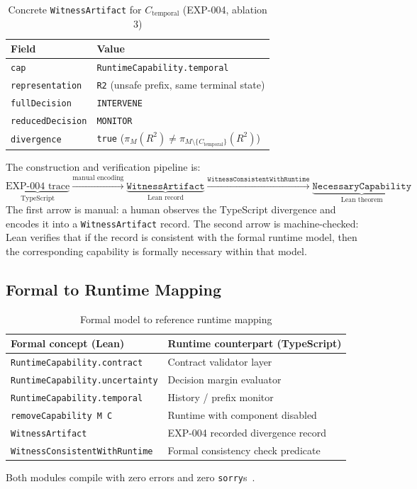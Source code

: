 \begin{table}[htbp]
\caption{Concrete \texttt{WitnessArtifact} for $C_{\text{temporal}}$ (EXP-004, ablation 3)}
\label{tab:witness-example}
\centering\small
\begin{tabular}{ll}
\toprule
\textbf{Field} & \textbf{Value} \\
\midrule
\texttt{cap}              & \texttt{RuntimeCapability.temporal} \\
\texttt{representation}   & \texttt{R2} (unsafe prefix, same terminal state) \\
\texttt{fullDecision}     & \texttt{INTERVENE} \\
\texttt{reducedDecision}  & \texttt{MONITOR} \\
\texttt{divergence}       & \texttt{true} ($\pi_M(R^2) \neq \pi_{M\setminus\{C_\text{temporal}\}}(R^2)$) \\
\bottomrule
\end{tabular}
\end{table}

The construction and verification pipeline is:
\[
\underbrace{\text{EXP-004 trace}}_{\text{TypeScript}}
\xrightarrow{\text{manual encoding}}
\underbrace{\texttt{WitnessArtifact}}_{\text{Lean record}}
\xrightarrow{\texttt{WitnessConsistentWithRuntime}}
\underbrace{\texttt{NecessaryCapability}}_{\text{Lean theorem}}
\]
The first arrow is manual: a human observes the TypeScript divergence and encodes
it into a \texttt{WitnessArtifact} record. The second arrow is machine-checked:
Lean verifies that if the record is consistent with the formal runtime model,
then the corresponding capability is formally necessary within that model.

\subsection{Formal to Runtime Mapping}

\begin{table}[htbp]
\caption{Formal model to reference runtime mapping}
\label{tab:formal-runtime}
\centering\small
\begin{tabular}{p{3.8cm}p{4.0cm}}
\toprule
\textbf{Formal concept (Lean)} & \textbf{Runtime counterpart (TypeScript)} \\
\midrule
\texttt{RuntimeCapability.contract}    & Contract validator layer \\
\texttt{RuntimeCapability.uncertainty} & Decision margin evaluator \\
\texttt{RuntimeCapability.temporal}    & History / prefix monitor \\
\texttt{removeCapability M C}          & Runtime with component disabled \\
\texttt{WitnessArtifact}               & EXP-004 recorded divergence record \\
\texttt{WitnessConsistentWithRuntime}  & Formal consistency check predicate \\
\bottomrule
\end{tabular}
\end{table}

Both modules compile with zero errors and zero \texttt{sorry}s~\cite{takt_st016_2026}.
